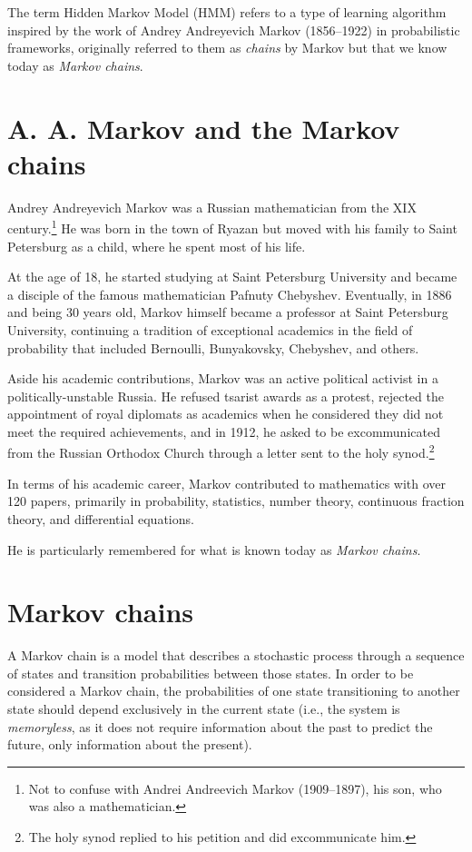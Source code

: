 The term Hidden Markov Model (HMM) refers to a type of learning algorithm inspired by the work of Andrey Andreyevich Markov (1856--1922) in probabilistic frameworks, originally referred to them as \emph{chains} by Markov but that we know today as \emph{Markov chains}.


\section{A. A. Markov and the Markov chains}
Andrey Andreyevich Markov was a Russian mathematician from the XIX century.\footnote{Not to confuse with Andrei Andreevich Markov (1909--1897), his son, who was also a mathematician.} He was born in the town of Ryazan but moved with his family to Saint Petersburg as a child, where he spent most of his life.

At the age of 18, he started studying at Saint Petersburg University and became a disciple of the famous mathematician Pafnuty Chebyshev. Eventually, in 1886 and being 30 years old, Markov himself became a professor at Saint Petersburg University, continuing a tradition of exceptional academics in the field of probability that included Bernoulli, Bunyakovsky, Chebyshev, and others.

Aside his academic contributions, Markov was an active political activist in a politically-unstable Russia. He refused tsarist awards as a protest, rejected the appointment of royal diplomats as academics when he considered they did not meet the required achievements, and in 1912, he asked to be excommunicated from the Russian Orthodox Church through a letter sent to the holy synod.\footnote{The holy synod replied to his petition and did excommunicate him.}

In terms of his academic career, Markov contributed to mathematics with over 120 papers, primarily in probability, statistics, number theory, continuous fraction theory, and differential equations.

He is particularly remembered for what is known today as \emph{Markov chains}.

\section{Markov chains}

A Markov chain is a model that describes a stochastic process through a sequence of states and transition probabilities between those states. In order to be considered a Markov chain, the probabilities of one state transitioning to another state should depend exclusively in the current state (i.e., the system is \emph{memoryless}, as it does not require information about the past to predict the future, only information about the present).

